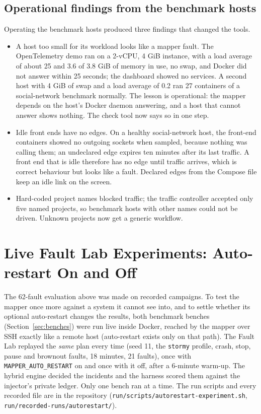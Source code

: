 \subsection{Operational findings from the benchmark hosts}
\label{sec:hostfindings}
Operating the benchmark hosts produced three findings that changed the tools.
\begin{itemize}
\item A host too small for its workload looks like a mapper fault. The OpenTelemetry demo ran on a 2-vCPU, 4 GiB instance, with a load average of about 25 and 3.6 of 3.8 GiB of memory in use, no swap, and Docker did not answer within 25 seconds; the dashboard showed no services. A second host with 4 GiB of swap and a load average of 0.2 ran 27 containers of a social-network benchmark normally. The lesson is operational: the mapper depends on the host's Docker daemon answering, and a host that cannot answer shows nothing. The check tool now says so in one step.
\item Idle front ends have no edges. On a healthy social-network host, the front-end containers showed no outgoing sockets when sampled, because nothing was calling them; an undeclared edge expires ten minutes after its last traffic. A front end that is idle therefore has no edge until traffic arrives, which is correct behaviour but looks like a fault. Declared edges from the Compose file keep an idle link on the screen.
\item Hard-coded project names blocked traffic; the traffic controller accepted only five named projects, so benchmark hosts with other names could not be driven. Unknown projects now get a generic workflow.
\end{itemize}


\section{Live Fault Lab Experiments: Auto-restart On and Off}
\label{sec:live}
The 62-fault evaluation above was made on recorded campaigns. To test the mapper once more against a system it cannot see into, and to settle whether its optional auto-restart changes the results, both benchmark benches (Section~\ref{sec:benches}) were run live inside Docker, reached by the mapper over SSH exactly like a remote host (auto-restart exists only on that path). The Fault Lab replayed the \emph{same} plan every time (seed 11, the \texttt{stormy} profile, crash, stop, pause and brownout faults, 18 minutes, 21 faults), once with \texttt{MAPPER\_AUTO\_RESTART} on and once with it off, after a 6-minute warm-up. The hybrid engine decided the incidents and the harness scored them against the injector's private ledger. Only one bench ran at a time. The run scripts and every recorded file are in the repository (\texttt{run/scripts/autorestart-experiment.sh}, \texttt{run/recorded-runs/autorestart/}).

